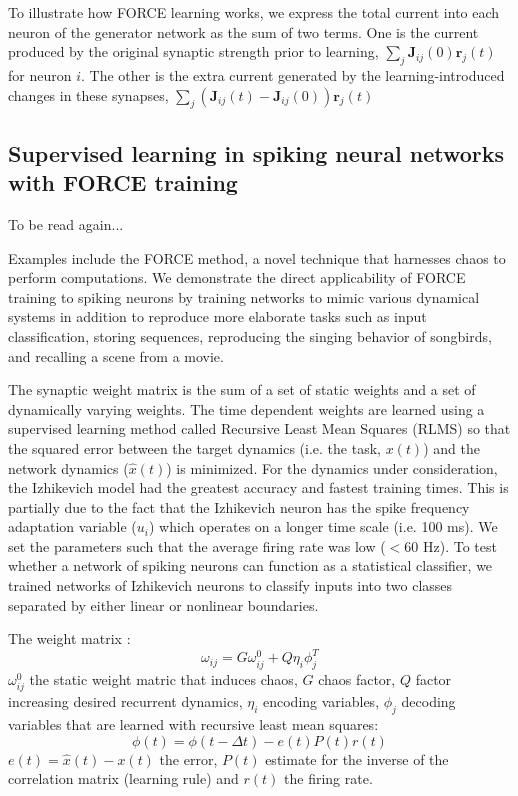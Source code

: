 \documentclass[12pt]{article}
\begin{document}
To illustrate how FORCE learning works, we express the total current into each neuron of the generator network as the sum of two terms. One is the current produced by the original synaptic strength prior to learning, $\sum_j \mathbf{J}_{ij}(0) \mathbf{r}_j(t)$ for neuron $i$. The other is the extra current generated by the learning-introduced changes in these synapses, $\sum_j(\mathbf{J}_{ij}(t) - \mathbf{J}_{ij}(0)) \mathbf{r}_j(t)$






\subsection{Supervised learning in spiking neural networks with FORCE training \cite{nicola2016supervised}}
To be read again...

Examples include the FORCE method, a novel technique that harnesses chaos to perform computations. We demonstrate the direct applicability of FORCE training to spiking neurons by training networks to mimic various dynamical systems in addition to reproduce more elaborate tasks such as input classification, storing sequences, reproducing the singing behavior of songbirds, and recalling a scene from a movie.

The synaptic weight matrix is the sum of a set of static weights and a set of dynamically varying weights. The time dependent weights are learned using a supervised learning method called Recursive Least Mean Squares (RLMS) so that the squared error between the target dynamics (i.e. the task, $x(t)$) and the network dynamics ($\hat{x}(t)$) is minimized. For the dynamics under consideration, the Izhikevich model had the greatest accuracy and fastest training times. This is partially due to the fact that the Izhikevich neuron has the spike frequency adaptation variable ($u_i$) which operates on a longer time scale (i.e. 100 ms). We set the parameters such that the average firing rate was low ($< 60$ Hz). To test whether a network of spiking neurons can function as a statistical classifier, we trained networks of Izhikevich neurons to classify inputs into two classes separated by either linear or nonlinear boundaries.

The weight matrix : \begin{equation}
\omega_{ij} = G \omega_{ij}^0 + Q \eta_i \phi_j^T
\end{equation}
$\omega_{ij}^0$ the static weight matric that induces chaos, $G$ chaos factor, $Q$ factor increasing desired recurrent dynamics, $\eta_i$ encoding variables, $\phi_j$ decoding variables that are learned with recursive least mean squares: \begin{equation}
\phi (t) = \phi (t-\Delta t) - e(t) P(t) r(t)
\end{equation}
$e(t) = \hat{x}(t) - x(t)$ the error, $P(t)$ estimate for the inverse of the correlation matrix (learning rule) and $r(t)$ the firing rate.
\end{document}
